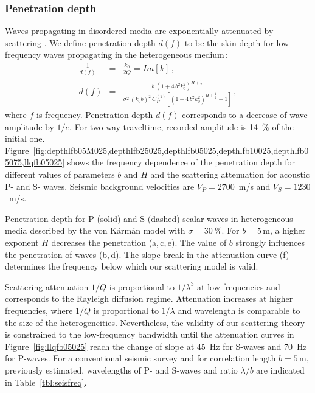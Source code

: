 \subsubsection{Penetration depth}


Waves propagating in disordered media are exponentially 
attenuated by scattering \cite[]{Odoherty_A71,White_SN90}.
We define penetration depth $d(f)$ to be the skin depth \cite[]{Vanderbaan_WS07}
for low-frequency waves propagating in the heterogeneous medium\,:
\begin{eqnarray}
\frac{1}{d(f)} & = & \frac{k_0}{2Q} = Im[k]\,,\\
d(f) & = & \frac{b~(1+4\,b^2k_0^2)^{H+\frac{1}{2}}}
{\sigma^2\,(k_0b)^2\,C^{(1)}_{H}\left[(1+4\,b^2k_0^2)^{H+\frac{1}{2}}-1\right]}\,, \label{eqn:penedep}
\end{eqnarray}
where $f$ is frequency.
Penetration depth $d(f)$ corresponds to a decrease of wave amplitude by $1/e$.
For two-way traveltime, recorded amplitude is 14~\% of the initial one.
Figure~\ref{fig:depthlfb05M025,depthlfb25025,depthlfb05025,depthlfb10025,depthlfb05075,llqfb05025}
shows the frequency dependence of the penetration depth for different values of parameters $b$ and $H$
and the scattering attenuation for acoustic P- and S- waves.
Seismic background velocities are $V_P=2700$~m/s and $V_S=1230$~m/s.

{Penetration depth for P (solid) and S (dashed) scalar waves
in heterogeneous media described by the von K\'arm\'an model with $\sigma=30~\%$.
For $b=5$\,m, a higher exponent $H$ decreases the penetration (a,\,c,\,e).
The value of $b$ strongly influences the penetration of waves (b,\,d).
The slope break in the attenuation curve (f) determines the frequency below which our scattering model
is valid.}

Scattering attenuation $1/Q$ is proportional to $1/\lambda^3$
at low frequencies and corresponds to the Rayleigh diffusion regime.
Attenuation increases at higher frequencies, where $1/Q$ is proportional to $1/\lambda$
and wavelength is comparable to the size of the heterogeneities.
Nevertheless, the validity of our scattering theory is constrained to 
the low-frequency bandwidth until the attenuation curves in Figure~\ref{fig:llqfb05025}
reach the change of slope at 45~Hz for S-waves and 70~Hz for P-waves.
For a conventional seismic survey and for correlation length $b=5$\,m, previously estimated,
wavelengths of P- and S-waves and ratio $\lambda/b$ are indicated in Table~\ref{tbl:seisfreq}.


